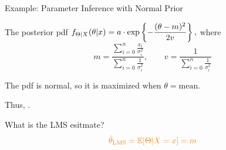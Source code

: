 









\begin{frame}{Example: Parameter Inference with Normal Prior}

\hfill {}

\plitemsep 0.05in
\bci

\item<1-> The posterior pdf $\displaystyle f_{\Theta|X}(\theta|x) = a \cdot \exp \left\{ -
    \frac{(\theta - m)^2}{2 v}  \right\},$ where
  $$
  m = \frac
  {\sum_{i=0}^n \frac{x_i}{\sigma_i^2}}
  {\sum_{i=0}^n \frac{1}{\sigma_i^2}}, \qquad v =
  \frac{1}{\sum_{i=0}^n \frac{1}{\sigma_i^2}}
  $$


\item<1-> The pdf is normal, so it is maximized when $\theta =
  \text{mean}.$

\item<1-> Thus, .

\item<2-> What is the LMS esitmate?  
  $$
  {\color{orange} \hat{\theta}_{\text{LMS}} = \mathbb{E}[ \Theta | X = x ] = m}
  $$

  \eci

\end{frame}



